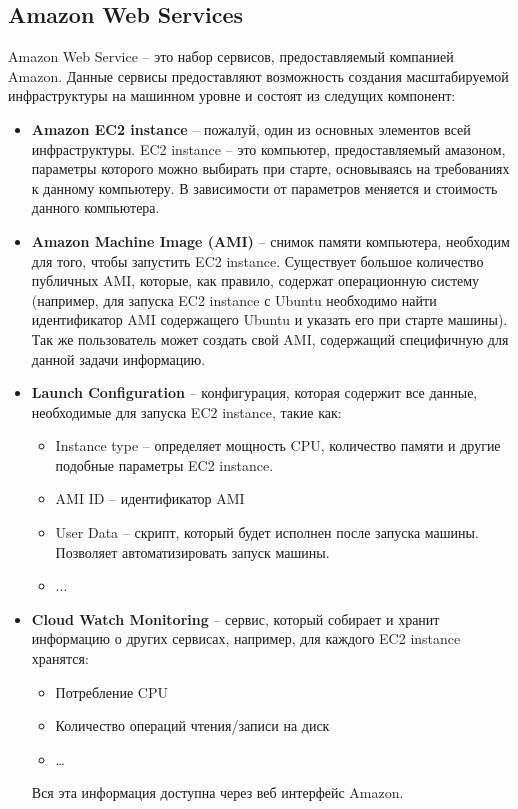 \subsection{Amazon Web Services}
	Amazon Web Service -- это набор сервисов, предоставляемый компанией Amazon. Данные сервисы предоставляют возможность создания масштабируемой инфраструктуры на машинном уровне и состоят из следущих компонент:
\begin{itemize}
	\item \textbf{Amazon EC2 instance} -- пожалуй, один из основных элементов всей инфраструктуры. EC2 instance -- это компьютер, предоставляемый амазоном, параметры которого можно выбирать при старте, основываясь на требованиях к данному компьютеру. В зависимости от параметров меняется и стоимость данного компьютера.
	\item \textbf{Amazon Machine Image (AMI)} -- снимок памяти компьютера, необходим для того, чтобы запустить EC2 instance. Существует большое количество публичных AMI, которые, как правило, содержат операционную систему (например, для запуска EC2 instance с Ubuntu необходимо найти идентификатор AMI содержащего Ubuntu  и указать его при старте машины). Так же пользователь может создать свой AMI, содержащий специфичную для данной задачи информацию.
	\item \textbf{Launch Configuration} -- конфигурация, которая содержит все данные, необходимые для запуска EC2 instance, такие как: 
	\begin{itemize}
		\item Instance type -- определяет мощность CPU, количество памяти и другие подобные параметры  EC2 instance.
		\item AMI ID -- идентификатор AMI
		\item User Data -- скрипт, который будет исполнен после запуска машины. Позволяет автоматизировать запуск машины.
		\item ...
	\end{itemize}
	\item \textbf{Cloud Watch Monitoring} -- сервис, который собирает и хранит информацию о других сервисах, например, для каждого EC2 instance хранятся: 
	\begin{itemize}
		\item Потребление CPU
		\item Количество операций чтения/записи на диск
		\item \dots
	\end{itemize}
	Вся эта информация доступна через веб интерфейс Amazon. %

\end{itemize}
